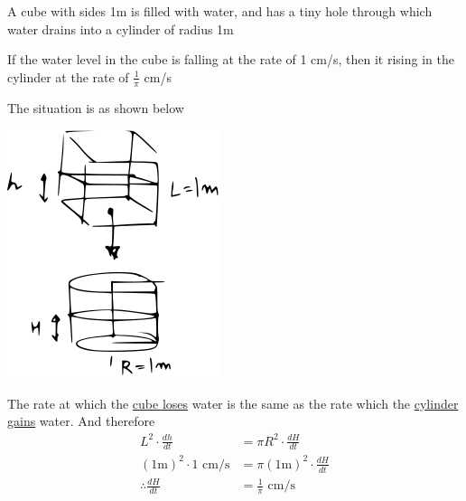 \documentclass[14pt,fleqn]{extarticle}
\newcommand\cmps{\text{ cm/s}}
\begin{document}
 
\begin{snippet}
    
    \correct
    
    A cube with sides 1m is filled with water, and has a tiny hole through 
    which water drains into a cylinder of radius 1m\newline 
    
    If the water level in the cube is falling at the rate of 1 cm/s, then 
    it rising in the cylinder at the rate of $\frac{1}\pi$ cm/s
    
    \reason
    
    The situation is as shown below 
    \begin{center}
\includegraphics[scale=1.2]{116-A.svg}
\end{center}

The rate at which the \underline{cube loses} water is the same as the rate which 
the \underline{cylinder gains} water. And therefore 
\begin{align}
	L^2\cdot\frac{dh}{dt} &= \pi R^2\cdot \frac{dH}{dt} \\
	\left(1\text{m} \right)^2\cdot 1\cmps &= \pi \left(1\text{m} \right)^2\cdot\frac{dH}{dt} \\
	\therefore \frac{dH}{dt} &= \frac{1}\pi\cmps 
\end{align}
    
\end{snippet} 
\end{document}
